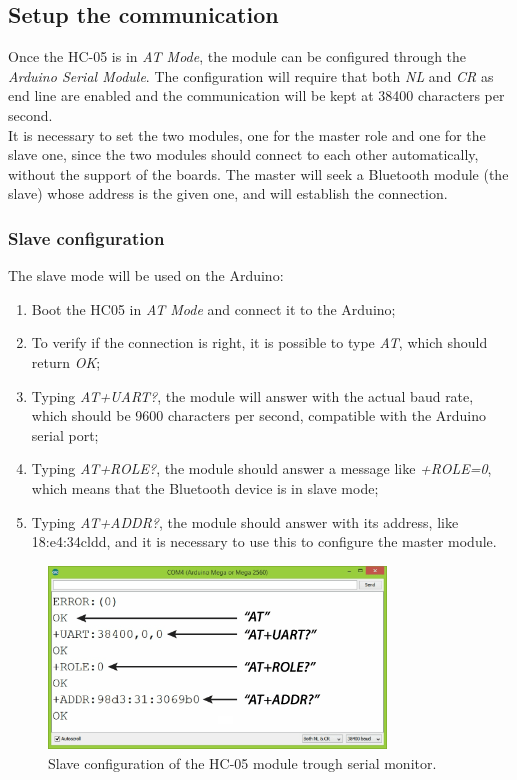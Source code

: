 \subsection{Setup the communication}
Once the HC-05 is in \textit{AT Mode}, the module can be configured through the \textit{Arduino Serial Module}. The configuration will require that both \textit{NL} and \textit{CR} as end line are enabled and the communication will be kept at 38400 characters per second.\\
It is necessary to set the two modules, one for the master role and one for the slave one, since the two modules should connect to each other automatically, without the support of the boards. The master will seek a Bluetooth module (the slave) whose address is the given one, and will establish the connection.

\subsubsection{Slave configuration}
The slave mode will be used on the Arduino:
\begin{enumerate}
	\item Boot the HC05 in \textit{AT Mode} and connect it to the Arduino;
	\item To verify if the connection is right, it is possible to type \textit{AT}, which should return \textit{OK};
	\item Typing \textit{AT+UART?}, the module will answer with the actual baud rate, which should be 9600 characters per second, compatible with the Arduino serial port;
	\item Typing \textit{AT+ROLE?}, the module should answer a message like \textit{+ROLE=0}, which means that the Bluetooth device is in slave mode;
	\item Typing \textit{AT+ADDR?}, the module should answer with its address, like 18:e4:34cldd, and it is necessary to use this to configure the master module.
\end{enumerate}

\begin{figure}[H]
	\hspace*{0.1 \textwidth}\includegraphics[width= 0.8\textwidth]
	{files/images/hc05_slave2}
	\caption{Slave configuration of the HC-05 module trough serial monitor.}
\end{figure}

